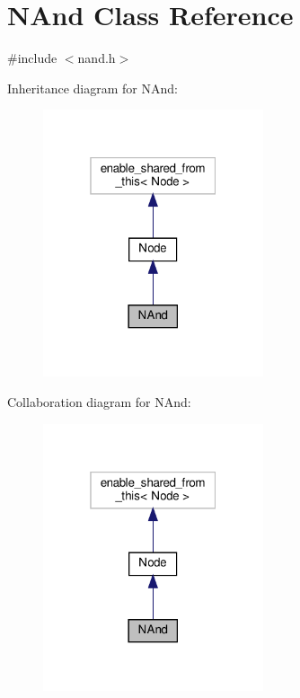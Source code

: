 \hypertarget{class_n_and}{}\section{N\+And Class Reference}
\label{class_n_and}


{\ttfamily \#include $<$nand.\+h$>$}



Inheritance diagram for N\+And\+:\nopagebreak
\begin{figure}[H]
\begin{center}
\leavevmode
\includegraphics[width=184pt]{de/dc5/class_n_and__inherit__graph}
\end{center}
\end{figure}


Collaboration diagram for N\+And\+:\nopagebreak
\begin{figure}[H]
\begin{center}
\leavevmode
\includegraphics[width=184pt]{d0/d12/class_n_and__coll__graph}
\end{center}
\end{figure}
